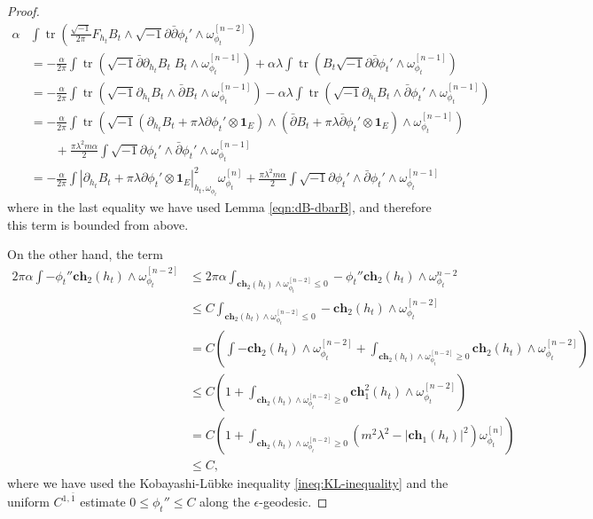 \documentclass[10pt, letterpaper]{amsart}
\newcommand{\tr}{\operatorname{tr}}
\theoremstyle{plain}
\theoremstyle{definition}
\numberwithin{equation}{section}
\begin{document}
\begin{proof}
\begin{align*}
 \alpha 
 & \int  \tr 
\left( \frac{\sqrt{-1}}{2\pi}F_{h_t} B_t\wedge \sqrt{-1}\partial\bar\partial \phi_t'\wedge \omega_{\phi_t}^{[n-2]}\right)\\
& 
=
-\frac{\alpha}{2\pi} 
\int \tr\left(
\sqrt{-1}\bar\partial \partial_{h_t}B_t\; B_t\wedge \omega_{\phi_t}^{[n-1]}\right)
 + 
\alpha\lambda \int \tr \left( B_t\sqrt{-1}\partial\bar\partial \phi_t'\wedge \omega_{\phi_t}^{[n-1]}\right)\\
& 
=
-\frac{\alpha}{2\pi}\int \tr \left(\sqrt{-1}\partial_{h_t}B_t\wedge\bar\partial B_t\wedge \omega_{\phi_t}^{[n-1]}\right)
-
\alpha\lambda \int \tr\left(\sqrt{-1}\partial_{h_t}B_t\wedge \bar\partial \phi_t'\wedge \omega_{\phi_t}^{[n-1]}\right)\\
& 
= 
-\frac{\alpha}{2\pi}
\int \tr \left( 
\sqrt{-1}\left(\partial_{h_t}B_t+\pi\lambda \partial\phi_t'\otimes \mathbf{1}_E\right)\wedge 
\left(\bar\partial B_t+\pi\lambda \bar\partial\phi_t'\otimes \mathbf{1}_E\right)\wedge \omega_{\phi_t}^{[n-1]}\right)\\
&\qquad
+ 
\frac{\pi\lambda^2 m\alpha}{2} \int \sqrt{-1}\partial \phi_t'\wedge \bar\partial \phi_t'\wedge \omega_{\phi_t}^{[n-1]}\\
& 
= 
-\frac{\alpha}{2\pi}
\int \left|\partial_{h_t}B_t + \pi\lambda \partial\phi_t'\otimes \mathbf{1}_E\right|_{h_t,\omega_{\phi_t}}^2 \omega_{\phi_t}^{[n]}
+ 
\frac{\pi\lambda^2 m\alpha}{2} \int \sqrt{-1}\partial \phi_t'\wedge \bar\partial \phi_t'\wedge \omega_{\phi_t}^{[n-1]}
\end{align*}
where in the last equality we have used Lemma \ref{eqn:dB-dbarB}, and therefore this term is bounded from above. 

On the other hand, the term 	
	\begin{align*}
	2\pi\alpha \int - \phi_t'' \mathbf{ch}_2\left(h_t\right)\wedge \omega_{\phi_t}^{[n-2]} 
	& \leq 
	2\pi\alpha \int_{\mathbf{ch}_2\left(h_t\right)\wedge \omega_{\phi_t}^{[n-2]} \leq 0} -\phi_t''\mathbf{ch}_2\left(h_t\right)\wedge \omega_{\phi_t}^{n-2} \\
	&\leq 
	C \int_{\mathbf{ch}_2\left(h_t\right)\wedge \omega_{\phi_t}^{[n-2]} \leq 0} -\mathbf{ch}_2\left(h_t\right)\wedge \omega_{\phi_t}^{[n-2]} \\
	& 
	= 
	C\left(  \int -\mathbf{ch}_2\left(h_t\right)\wedge \omega_{\phi_t}^{[n-2]} 
	+ 
	 \int_{\mathbf{ch}_2\left(h_t\right)\wedge \omega_{\phi_t}^{[n-2]} \geq 0} \mathbf{ch}_2\left(h_t\right)\wedge \omega_{\phi_t}^{[n-2]}
	\right)\\
	& \leq 
	C\left( 1 + 
	 \int_{\mathbf{ch}_2\left(h_t\right)\wedge \omega_{\phi_t}^{[n-2]} \geq 0} \mathbf{ch}_1^2\left(h_t\right)\wedge \omega_{\phi_t}^{[n-2]}\right) \\
	 & 
	 = 
	 C\left( 1 + 
	 \int_{\mathbf{ch}_2\left(h_t\right)\wedge \omega_{\phi_t}^{[n-2]} \geq 0} 
	 \left( m^2\lambda^2-  \left|\mathbf{ch}_1\left(h_t\right)\right|^2\right) \omega_{\phi_t}^{[n]}\right)\\
	 & \leq 
	 C, 
	\end{align*}
	where we have used the Kobayashi-L\"ubke inequality \eqref{ineq:KL-inequality} and the uniform $C^{1,\bar 1}$ estimate $0\leq \phi_t''\leq C$ along the $\epsilon$-geodesic. 
	

\end{proof}
\end{document}
